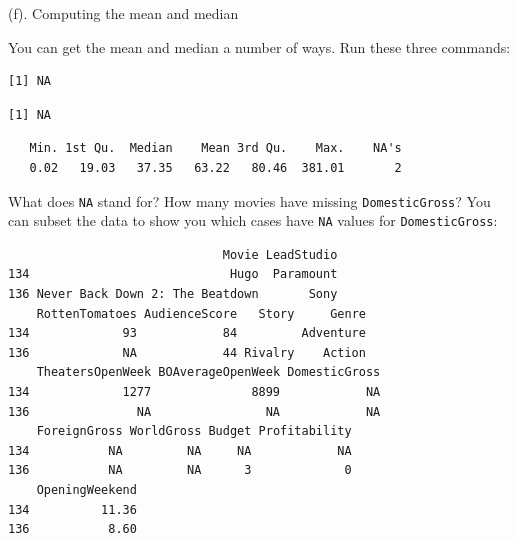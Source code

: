 \documentclass[
]{book}
\newenvironment{Shaded}{\begin{snugshade}}{\end{snugshade}}
\newcommand{\FunctionTok}[1]{\textcolor[rgb]{0.00,0.00,0.00}{#1}}
\newcommand{\NormalTok}[1]{#1}
\newcommand{\SpecialCharTok}[1]{\textcolor[rgb]{0.00,0.00,0.00}{#1}}
\begin{document}
(f). Computing the mean and median

You can get the mean and median a number of ways. Run these three commands:

\begin{Shaded}
\end{Shaded}

\begin{verbatim}
[1] NA
\end{verbatim}

\begin{Shaded}
\end{Shaded}

\begin{verbatim}
[1] NA
\end{verbatim}

\begin{Shaded}
\end{Shaded}

\begin{verbatim}
   Min. 1st Qu.  Median    Mean 3rd Qu.    Max.    NA's 
   0.02   19.03   37.35   63.22   80.46  381.01       2 
\end{verbatim}

What does \texttt{NA} stand for? How many movies have missing \texttt{DomesticGross}? You can subset the data to show you which cases have \texttt{NA} values for \texttt{DomesticGross}:

\begin{Shaded}
\end{Shaded}

\begin{verbatim}
                              Movie LeadStudio
134                            Hugo  Paramount
136 Never Back Down 2: The Beatdown       Sony
    RottenTomatoes AudienceScore   Story     Genre
134             93            84         Adventure
136             NA            44 Rivalry    Action
    TheatersOpenWeek BOAverageOpenWeek DomesticGross
134             1277              8899            NA
136               NA                NA            NA
    ForeignGross WorldGross Budget Profitability
134           NA         NA     NA            NA
136           NA         NA      3             0
    OpeningWeekend
134          11.36
136           8.60
\end{verbatim}
\end{document}

